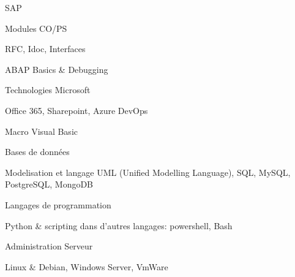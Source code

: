 

\begin{cventries}
	
	\zcventry
	{SAP} %
	{
		\begin{cvitems} %
			\item {Modules CO/PS}
			\item {RFC, Idoc, Interfaces}
			\item {ABAP Basics \& Debugging}
		\end{cvitems}
	}

	\zcventry
	{Technologies Microsoft} %
	{
		\begin{cvitems} %
			\item {Office 365, Sharepoint, Azure DevOps}
			\item {Macro Visual Basic}
		\end{cvitems}
	}
	
	\zcventry
	{Bases de données} %
	{
		\begin{cvitems} %
			\item {Modelisation et langage UML (Unified Modelling Language), SQL, MySQL, PostgreSQL, MongoDB}
		\end{cvitems}
	}
	
	\zcventry
	{Langages de programmation} %
	{
		\begin{cvitems} %
			\item {Python \& scripting dans d'autres langages: powershell, Bash}
		\end{cvitems}
	}
	
	\zcventry
	{Administration Serveur} %
	{
		\begin{cvitems} %
			\item {Linux \& Debian, Windows Server, VmWare}
		\end{cvitems}
	}
	

\end{cventries}
